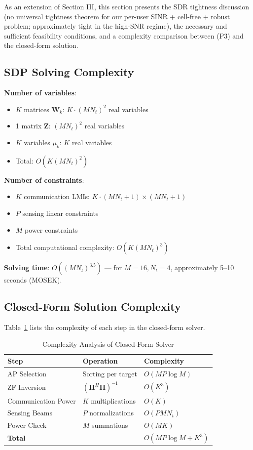\documentclass[12pt,a4paper]{article}
\newcommand{\mat}[1]{\mathbf{#1}}
\begin{document}
As an extension of Section III, this section presents the SDR tightness discussion (no universal tightness theorem for our per-user SINR + cell-free + robust problem; approximately tight in the high-SNR regime), the necessary and sufficient feasibility conditions, and a complexity comparison between (P3) and the closed-form solution.

\subsection{SDP Solving Complexity}

\textbf{Number of variables}:
\begin{itemize}
    \item $K$ matrices $\mat{W}_k$: $K \cdot (MN_t)^2$ real variables
    \item 1 matrix $\mat{Z}$: $(MN_t)^2$ real variables
    \item $K$ variables $\mu_k$: $K$ real variables
    \item Total: $O(K(MN_t)^2)$
\end{itemize}

\textbf{Number of constraints}:
\begin{itemize}
    \item $K$ communication LMIs: $K \cdot (MN_t+1) \times (MN_t+1)$
    \item $P$ sensing linear constraints
    \item $M$ power constraints
    \item Total computational complexity: $O(K(MN_t)^3)$
\end{itemize}

\textbf{Solving time}: $O((MN_t)^{3.5})$ --- for $M=16, N_t=4$, approximately 5--10 seconds (MOSEK).

\subsection{Closed-Form Solution Complexity}

Table~\ref{tab:complexity} lists the complexity of each step in the closed-form solver.

\begin{table}[htbp]
\centering
\caption{Complexity Analysis of Closed-Form Solver}\label{tab:complexity}
\begin{tabular}{lll}
\toprule
Step & Operation & Complexity \\
\midrule
AP Selection & Sorting per target & $O(MP \log M)$ \\
ZF Inversion & $(\mat{H}^H\mat{H})^{-1}$ & $O(K^3)$ \\
Communication Power & $K$ multiplications & $O(K)$ \\
Sensing Beams & $P$ normalizations & $O(PMN_t)$ \\
Power Check & $M$ summations & $O(MK)$ \\
\midrule
\textbf{Total} & & \textbf{$O(MP\log M + K^3)$} \\
\bottomrule
\end{tabular}
\end{table}
\end{document}
